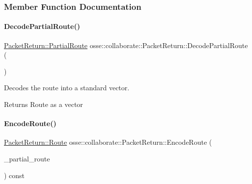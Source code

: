 \subsubsection{Member Function Documentation}
\mbox{\label{classosse_1_1collaborate_1_1_packet_return_a2534afa0446ef8f4dbe9c051607e55d7}} 
\paragraph{\texorpdfstring{Decode\+Partial\+Route()}{DecodePartialRoute()}}
{\footnotesize\ttfamily \hyperlink{classosse_1_1collaborate_1_1_packet_return_a56d5b319f0625cdabbfc4f6cbd01b002}{Packet\+Return\+::\+Partial\+Route} osse\+::collaborate\+::\+Packet\+Return\+::\+Decode\+Partial\+Route (\begin{DoxyParamCaption}{ }\end{DoxyParamCaption})}



Decodes the route into a standard vector. 

\begin{DoxyReturn}{Returns}
Route as a vector 
\end{DoxyReturn}
\mbox{\label{classosse_1_1collaborate_1_1_packet_return_a8b63f26c2503ba37b133aab0da1e718c}} 
\paragraph{\texorpdfstring{Encode\+Route()}{EncodeRoute()}}
{\footnotesize\ttfamily \hyperlink{classosse_1_1collaborate_1_1_packet_return_a1c00d25b9e8d526be915c28b8ee0ba3b}{Packet\+Return\+::\+Route} osse\+::collaborate\+::\+Packet\+Return\+::\+Encode\+Route (\begin{DoxyParamCaption}\item[{const \hyperlink{classosse_1_1collaborate_1_1_packet_return_a56d5b319f0625cdabbfc4f6cbd01b002}{Partial\+Route} \&}]{\+\_\+partial\+\_\+route }\end{DoxyParamCaption}) const\hspace{0.3cm}{\ttfamily [private]}}



